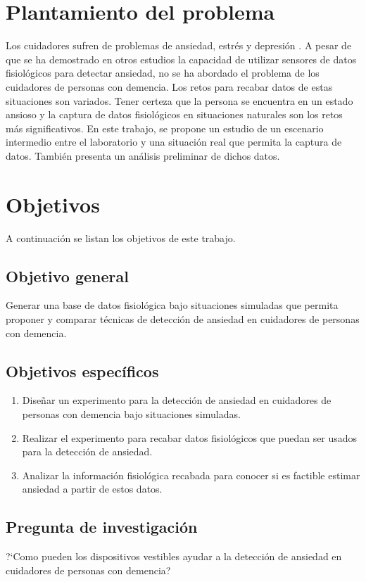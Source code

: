 \section{Plantamiento del problema}
Los cuidadores sufren de problemas de ansiedad, estr\'es y depresi\'on \citep{Joling2014}. A pesar de que se ha demostrado en otros estudios la capacidad de utilizar sensores de datos fisiol\'ogicos para detectar ansiedad, no se ha abordado el problema de los cuidadores de personas con demencia. Los retos para recabar datos de estas situaciones son variados. Tener certeza que la persona se encuentra en un estado ansioso y la captura de datos fisiol\'ogicos en situaciones naturales son los retos m\'as significativos. En este trabajo, se propone un estudio de un escenario intermedio entre el laboratorio y una situaci\'on real que permita la captura de datos. Tambi\'en presenta un an\'alisis preliminar de dichos datos.
\section{Objetivos}
	A continuaci\'on se listan los objetivos de este trabajo.
\subsection{Objetivo general}
	Generar una base de datos fisiol\'ogica bajo situaciones simuladas que permita proponer y comparar t\'ecnicas de detecci\'on de ansiedad en cuidadores de personas con demencia.
\subsection{Objetivos espec\'ificos}
	\begin{enumerate}
		\item Dise\~nar un experimento para la detecci\'on de ansiedad en cuidadores de personas con demencia bajo situaciones simuladas.
		\item Realizar el experimento para recabar datos fisiol\'ogicos que puedan ser usados para la detecci\'on de ansiedad.
		\item Analizar la informaci\'on fisiol\'ogica recabada para conocer si es factible estimar ansiedad a partir de estos datos.
	\end{enumerate}
\subsection{Pregunta de investigaci\'on}
	?`Como pueden los dispositivos vestibles ayudar a la detecci\'on de ansiedad en cuidadores de personas con demencia?
